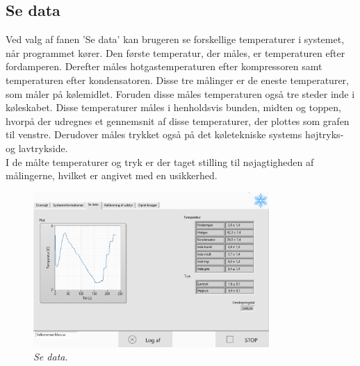 \documentclass[../Hovedrapport.tex]{subfiles}
\begin{document}
\subsection*{Se data}
Ved valg af fanen 'Se data' kan brugeren se forskellige temperaturer i systemet, når programmet kører. Den første temperatur, der måles, er temperaturen efter fordamperen. Derefter måles hotgastemperaturen efter kompressoren samt temperaturen efter kondensatoren. Disse tre målinger er de eneste temperaturer, som måler på kølemidlet. Foruden disse måles temperaturen også tre steder inde i køleskabet. Disse temperaturer måles i henholdsvis bunden, midten og toppen, hvorpå der udregnes et gennemsnit af disse temperaturer, der plottes som grafen til venstre. Derudover måles trykket også på det køletekniske systems højtryks- og lavtrykside.\\
I de målte temperaturer og tryk er der taget stilling til nøjagtigheden af målingerne, hvilket er angivet med en usikkerhed.
\begin{figure}[H]
	\centering
	\includegraphics[width=0.80\textwidth]{Billeder/se_data.png}
	\caption{\textit{Se data}.}
	\label{fig:se_data}
\end{figure}
\end{document}
